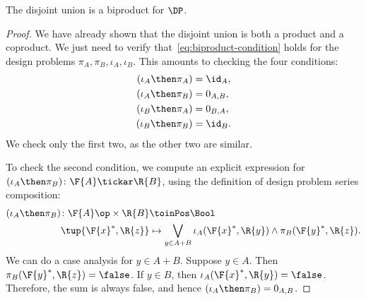 \begin{lemma}
The disjoint union is a biproduct for $\DP$.
\end{lemma}
\begin{proof}
    We have already shown that the disjoint union is both
    a product and a coproduct. We just need to verify that~\cref{eq:biproduct-condition} holds
    for the design problems $\pi_A, \pi_B, \iota_A, \iota_B$.
    This amounts to checking the four conditions:
    \begin{equation}
    \begin{aligned}
        (\iota_A\then \pi_A) &= \id_{A}, \\
        (\iota_A\then \pi_B) &= 0_{A,B}, \\
        (\iota_B\then \pi_A) &= 0_{B,A},\\
        (\iota_B\then \pi_B) &= \id_{B}.
    \end{aligned}
    \end{equation}
    We check only the first two, as the other two are similar.

    To check the second condition, we compute an explicit expression for $(\iota_A\then \pi_B)\colon \F{A} \tickar \R{B}$, using the definition
    of design problem series composition:
    \begin{equation}
    \begin{aligned}
        (\iota_A\then \pi_B) \colon  \F{A}\op\times \R{B} & \toinPos \Bool \\
                            \tup{\F{x}^*, \R{z}} &\mapsto
                            \bigvee_{y \in A + B} \iota_A(\F{x}^*,\R{y}) \wedge \pi_B(\F{y}^*,\R{z}).
    \end{aligned}
    \end{equation}
    We can do a case analysis for $y\in A+B$. Suppose $y\in A$.
    Then $\pi_B(\F{y}^*,\R{z}) = \false$. If $y \in B$, then $\iota_A(\F{x}^*,\R{y}) = \false$.
    Therefore, the sum is always false, and hence $(\iota_A\then \pi_B) = 0_{A,B}$.


\end{proof}
